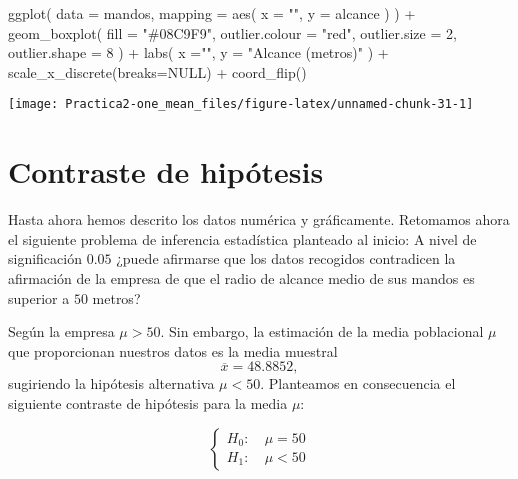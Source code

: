 \documentclass[
  degree=mecinf,
  title=normal,
  toc=normal,
  bib=normal]{mnye}
\newenvironment{Shaded}{\begin{snugshade}}{\end{snugshade}}
\newcommand{\AttributeTok}[1]{\textcolor[rgb]{0.77,0.63,0.00}{#1}}
\newcommand{\ConstantTok}[1]{\textcolor[rgb]{0.00,0.00,0.00}{#1}}
\newcommand{\DecValTok}[1]{\textcolor[rgb]{0.00,0.00,0.81}{#1}}
\newcommand{\FunctionTok}[1]{\textcolor[rgb]{0.00,0.00,0.00}{#1}}
\newcommand{\NormalTok}[1]{#1}
\newcommand{\SpecialCharTok}[1]{\textcolor[rgb]{0.00,0.00,0.00}{#1}}
\newcommand{\StringTok}[1]{\textcolor[rgb]{0.31,0.60,0.02}{#1}}
\begin{document}
\begin{Shaded}
\begin{Highlighting}[]
\FunctionTok{ggplot}\NormalTok{(}
    \AttributeTok{data =}\NormalTok{ mandos,}
    \AttributeTok{mapping =} \FunctionTok{aes}\NormalTok{(}
        \AttributeTok{x =} \StringTok{""}\NormalTok{,}
        \AttributeTok{y =}\NormalTok{ alcance}
\NormalTok{    )}
\NormalTok{) }\SpecialCharTok{+}
\FunctionTok{geom\_boxplot}\NormalTok{(}
  \AttributeTok{fill =} \StringTok{"\#08C9F9"}\NormalTok{,}
  \AttributeTok{outlier.colour =} \StringTok{"red"}\NormalTok{,}
  \AttributeTok{outlier.size =} \DecValTok{2}\NormalTok{,}
  \AttributeTok{outlier.shape =} \DecValTok{8}
\NormalTok{) }\SpecialCharTok{+}
\FunctionTok{labs}\NormalTok{(}
  \AttributeTok{x =}\StringTok{""}\NormalTok{, }
  \AttributeTok{y =} \StringTok{"Alcance (metros)"}
\NormalTok{) }\SpecialCharTok{+}
\FunctionTok{scale\_x\_discrete}\NormalTok{(}\AttributeTok{breaks=}\ConstantTok{NULL}\NormalTok{) }\SpecialCharTok{+}
\FunctionTok{coord\_flip}\NormalTok{()  }
\end{Highlighting}
\end{Shaded}

\begin{center}\texttt{[image: Practica2-one\_mean\_files/figure-latex/unnamed-chunk-31-1]} \end{center}

\hypertarget{contraste-de-hipuxf3tesis}{%
\section{Contraste de hipótesis}\label{contraste-de-hipuxf3tesis}}

Hasta ahora hemos descrito los datos numérica y gráficamente.
Retomamos ahora el siguiente problema de inferencia estadística planteado al inicio: A nivel de significación \(0.05\) ¿puede afirmarse que los datos recogidos contradicen la afirmación de la empresa de que el radio de alcance medio de sus mandos es superior a \(50\) metros?

Según la empresa \(\mu>50\). Sin embargo, la estimación de la media poblacional \(\mu\) que proporcionan nuestros
datos es la media muestral
\[\overline{x}=48.8852,\] sugiriendo la hipótesis alternativa \(\mu < 50\). Planteamos en consecuencia el siguiente contraste de hipótesis para la media \(\mu\):

\[
  \left\{
    \begin{array}{lc}
    H_0:\ & \mu= 50\\
    H_1:\ & \mu <50
    \end{array}
    \right.
\]
\end{document}

